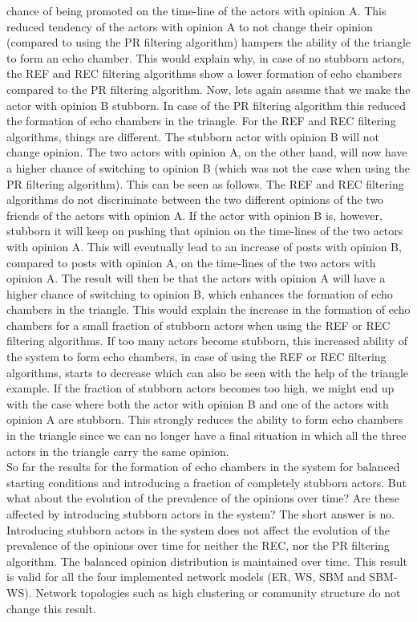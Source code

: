\documentclass[11 pt , letterpaper , twoside , openright]{book}
\begin{document}
chance of being promoted on the time-line of the actors with opinion A. This reduced tendency of the actors with opinion A to not change their opinion (compared to using the PR filtering algorithm) hampers the ability of the triangle to form an echo chamber. This would explain why, in case of no stubborn actors, the REF and REC filtering algorithms show a lower formation of echo chambers compared to the PR filtering algorithm. Now, lets again assume that we make the actor with opinion B stubborn. In case of the PR filtering algorithm this reduced the formation of echo chambers in the triangle. For the REF and REC filtering algorithms, things are different. The stubborn actor with opinion B will not change opinion. The two actors with opinion A, on the other hand, will now have a higher chance of switching to opinion B (which was not the case when using the PR filtering algorithm). This can be seen as follows. The REF and REC filtering algorithms do not discriminate between the two different opinions of the two friends of the actors with opinion A. If the actor with opinion B is, however, stubborn it will keep on pushing that opinion on the time-lines of the two actors with opinion A. This will eventually lead to an increase of posts with opinion B, compared to posts with opinion A, on the time-lines of the two actors with opinion A. The result will then be that the actors with opinion A will have a higher chance of switching to opinion B, which enhances the formation of echo chambers in the triangle. This would explain the increase in the formation of echo chambers for a small fraction of stubborn actors when using the REF or REC filtering algorithms. If too many actors become stubborn, this increased ability of the system to form echo chambers, in case of using the REF or REC filtering algorithms, starts to decrease which can also be seen with the help of the triangle example. If the fraction of stubborn actors becomes too high, we might end up with the case where both the actor with opinion B and one of the actors with opinion A are stubborn. This strongly reduces the ability to form echo chambers in the triangle since we can no longer have a final situation in which all the three actors in the triangle carry the same opinion.\\
\newline
So far the results for the formation of echo chambers in the system for balanced starting conditions and introducing a fraction of completely stubborn actors. But what about the evolution of the prevalence of the opinions over time? Are these affected by introducing stubborn actors in the system? The short answer is no. Introducing stubborn actors in the system does not affect the evolution of the prevalence of the opinions over time for neither the REC, nor the PR filtering algorithm. The balanced opinion distribution is maintained over time. This result is valid for all the four implemented network models (ER, WS, SBM and SBM-WS). Network topologies such as high clustering or community structure do not change this result. \\%
\end{document}

